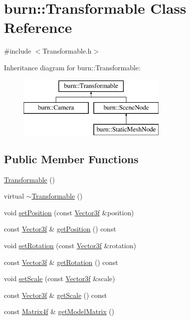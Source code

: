 \hypertarget{classburn_1_1_transformable}{\section{burn\-:\-:Transformable Class Reference}
\label{classburn_1_1_transformable}
}


{\ttfamily \#include $<$Transformable.\-h$>$}

Inheritance diagram for burn\-:\-:Transformable\-:\begin{figure}[H]
\begin{center}
\leavevmode
\includegraphics[height=3.000000cm]{classburn_1_1_transformable}
\end{center}
\end{figure}
\subsection*{Public Member Functions}
\begin{DoxyCompactItemize}
\item 
\hyperlink{classburn_1_1_transformable_ab5df8f6f319ebc8888465632a1567981}{Transformable} ()
\item 
virtual \hyperlink{classburn_1_1_transformable_a421e6dc05fe22e624f25c346380624b7}{$\sim$\-Transformable} ()
\item 
void \hyperlink{classburn_1_1_transformable_a408d484d0ed48c1d7499391b3f2d4a66}{set\-Position} (const \hyperlink{namespaceburn_a9d6d349c94bc4dc9699427216128a0ef}{Vector3f} \&position)
\item 
const \hyperlink{namespaceburn_a9d6d349c94bc4dc9699427216128a0ef}{Vector3f} \& \hyperlink{classburn_1_1_transformable_ac2946b97405311e3aff7f86fc6b0cd59}{get\-Position} () const 
\item 
void \hyperlink{classburn_1_1_transformable_adad877d654e3ac20ed0ff6edf002e040}{set\-Rotation} (const \hyperlink{namespaceburn_a9d6d349c94bc4dc9699427216128a0ef}{Vector3f} \&rotation)
\item 
const \hyperlink{namespaceburn_a9d6d349c94bc4dc9699427216128a0ef}{Vector3f} \& \hyperlink{classburn_1_1_transformable_a14977c0459a9bec1fd935a5967111311}{get\-Rotation} () const 
\item 
void \hyperlink{classburn_1_1_transformable_a7e73a5706524923d4fc6c13990b7f575}{set\-Scale} (const \hyperlink{namespaceburn_a9d6d349c94bc4dc9699427216128a0ef}{Vector3f} \&scale)
\item 
const \hyperlink{namespaceburn_a9d6d349c94bc4dc9699427216128a0ef}{Vector3f} \& \hyperlink{classburn_1_1_transformable_a7e6d9642bcb49deb83b38a3831824b52}{get\-Scale} () const 
\item 
const \hyperlink{namespaceburn_a643e9d2ffceb4304e3755a100268a7a3}{Matrix4f} \& \hyperlink{classburn_1_1_transformable_a8743b842184630917ee67e8e8039fc6f}{get\-Model\-Matrix} ()
\end{DoxyCompactItemize}
